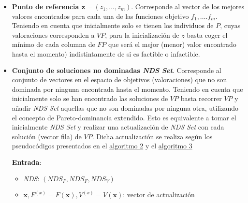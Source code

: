 \begin{itemize}
\item \textbf{Punto de referencia $\boldsymbol{z} = (z_1, \dots, z_m)$}. Corresponde al vector de los mejores valores encontrados para cada una de las funciones objetivo $f_1, \dots. f_m$. Teniendo en cuenta que inicialmente solo se tienen los individuos de $P$, cuyas valoraciones corresponden a $VP$, para la inicialización de $z$ basta coger el mínimo de cada columna de $FP$ que será el mejor (menor) valor encontrado hasta el momento) indistintamente de si es factible o infactible.\\

\item \textbf{Conjunto de soluciones no dominadas \textit{NDS Set}}. Corresponde al conjunto de vectores en el espacio de objetivos (valoraciones) que no son dominada por ninguna encontrada hasta el momento. Teniendo en cuenta que inicialmente solo se han encontrado las soluciones de $VP$ basta recorrer $VP$ y añadir \textit{NDS Set} aquellas que no son dominadas por ninguna otra, utilizando el concepto de Pareto-dominancia extendido. Esto es equivalente a tomar el inicialmente \textit{NDS Set} y realizar una actualización de \textit{NDS Set} con cada solución (vector fila) de $VP$. Dicha actualización se realiza según los pseudocódigos presentados en el \hyperref[alg:2]{algoritmo 2} y el \hyperref[alg:3]{algoritmo 3}\\

\begin{center}
\begin{minipage}[H]{0.8\linewidth}
    \begin{algorithm}[H]
\SetAlgoLined
 \textbf{Entrada}:
 \begin{itemize}
 
     \vspace{0.15cm}\item \textit{NDS}: $(NDS_P, NDS_F, NDS_V)$	
     
    \vspace{0.15cm}\item $\boldsymbol{x}, F^{(x)} = F(\boldsymbol{x}), V^{(x)} = V(\boldsymbol{x})$: vector de actualización
 \end{itemize}
 
 \vspace{0.3cm}
  

\end{algorithm}
\end{minipage}
\end{center}
\end{itemize}
